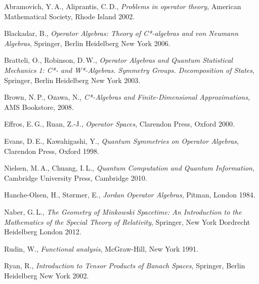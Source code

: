 \clearpage
{}
{\footnotesize 
\renewcommand{\bibname}{Bibliografia}

\begin{thebibliography}{99}

    Abramovich, Y.\,A., Aliprantis, C.\,D.,
    \emph{Problems in operator theory},
    American Mathematical Society, Rhode Island 2002.

    Blackadar, B., \emph{Operator Algebras: Theory of C*-algebras and von Neumann Algebras},
    Springer, Berlin Heidelberg New York 2006.

    Bratteli, O., Robinson, D.\,W.,
    \emph{Operator Algebras and Quantum Statistical Mechanics 1: C*- and W*-Algebras. Symmetry Groups. Decomposition of States},
    Springer, Berlin Heidelberg New York 2003.

    Brown, N.\,P., Ozawa, N.,
    \emph{C*-Algebras and Finite-Dimensional Approximations}, AMS Bookstore, 2008.


    Effros, E.\,G., Ruan, Z.-J., \emph{Operator Spaces}, Clarendon Press, Oxford 2000.

    Evans, D.\,E., Kawahigashi, Y.,
    \emph{Quantum Symmetries on Operator Algebras}, Clarendon Press, Oxford 1998.

    Nielsen, M.\,A., Chuang, I.\,L.,
    \emph{Quantum Computation and Quantum Information},
    Cambridge University Press, Cambridge 2010.

    Hanche-Olsen, H., St{\o}rmer, E., \emph{Jordan Operator Algebras},
    Pitman, London 1984.

    Naber, G.\,L.,
    \emph{The Geometry of Minkowski Spacetime: An Introduction to the Mathematics of the Special Theory of Relativity},
    Springer, New York Dordrecht Heidelberg London 2012.

    Rudin, W.,
    \emph{Functional analysis},
    McGraw-Hill, New York 1991.

    Ryan, R., \emph{Introduction to Tensor Products of Banach Spaces},
    Springer, Berlin Heidelberg New York 2002.


\end{thebibliography}}

